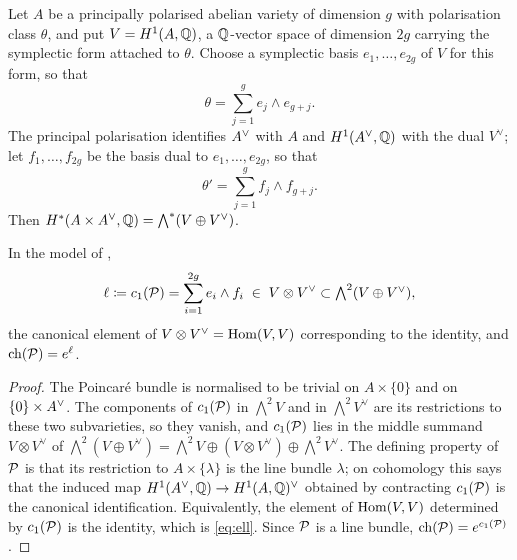 \begin{notation}\label{not:model}
Let $A$ be a principally polarised abelian variety of dimension $g$ with
polarisation class $\theta$, and put $V=H^{1}(A,\mathbb{Q})$, a $\mathbb{Q}$-vector space of
dimension $2g$ carrying the symplectic form attached to $\theta$. Choose a
symplectic basis $e_{1},\dots,e_{2g}$ of $V$ for this form, so that
\begin{equation}\label{eq:thetamodel}
  \theta=\sum_{j=1}^{g}e_{j}\wedge e_{g+j}.
\end{equation}
The principal polarisation identifies $A^{\vee}$ with $A$ and
$H^{1}(A^{\vee},\mathbb{Q})$ with the dual $V^{\vee}$; let $f_{1},\dots,f_{2g}$ be the
basis dual to $e_{1},\dots,e_{2g}$, so that
\begin{equation}\label{eq:thetapmodel}
  \theta'=\sum_{j=1}^{g}f_{j}\wedge f_{g+j}.
\end{equation}
Then $H^{*}(A\times A^{\vee},\mathbb{Q})=\bigwedge^{*}(V\oplus V^{\vee})$.
\end{notation}

\begin{lemma}\label{lem:poincare}
In the model of ,
\begin{equation}\label{eq:ell}
  \ell\coloneqq c_{1}(\mathcal{P})=\sum_{i=1}^{2g}e_{i}\wedge f_{i}
  \;\in\;V\otimes V^{\vee}\subset\textstyle\bigwedge^{2}(V\oplus V^{\vee}),
\end{equation}
the canonical element of $V\otimes V^{\vee}=\operatorname{Hom}(V,V)$ corresponding to the
identity, and $\operatorname{ch}(\mathcal{P})=e^{\ell}$.
\end{lemma}

\begin{proof}
The Poincar\'e bundle is normalised to be trivial on $A\times\{0\}$ and on
$\{0\}\times A^{\vee}$. The components of $c_{1}(\mathcal{P})$ in $\bigwedge^{2}V$ and in
$\bigwedge^{2}V^{\vee}$ are its restrictions to these two subvarieties, so
they vanish, and $c_{1}(\mathcal{P})$ lies in the middle summand $V\otimes V^{\vee}$
of
$\bigwedge^{2}(V\oplus V^{\vee})=\bigwedge^{2}V\oplus(V\otimes V^{\vee})\oplus\bigwedge^{2}V^{\vee}$.
The defining property of $\mathcal{P}$ is that its restriction to $A\times\{\lambda\}$
is the line bundle $\lambda$; on cohomology this says that the induced map
$H^{1}(A^{\vee},\mathbb{Q})\to H^{1}(A,\mathbb{Q})^{\vee}$ obtained by contracting $c_{1}(\mathcal{P})$ is
the canonical identification. Equivalently, the element of $\operatorname{Hom}(V,V)$
determined by $c_{1}(\mathcal{P})$ is the identity, which is \eqref{eq:ell}. Since
$\mathcal{P}$ is a line bundle, $\operatorname{ch}(\mathcal{P})=e^{c_{1}(\mathcal{P})}$.
\end{proof}

